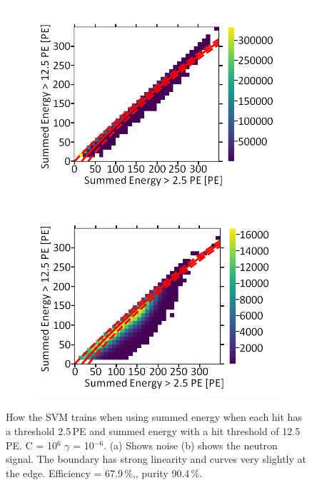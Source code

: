 \begin{figure}[!h]
\centering
\begin{subfigure}{.5\textwidth}
  \centering
  \includegraphics[width=\linewidth]{Appendix1/Figs/Sum1Sum2Noise.png}
  \captionsetup{width=.9\linewidth}
  \caption{}
  \label{subFig:Sum1Sum2N}
\end{subfigure}%
\begin{subfigure}{.5\textwidth}
  \centering
\includegraphics[width=\linewidth]{Appendix1/Figs/Sum1Sum2Signal.png}
  \captionsetup{width=.9\linewidth}
  \caption{}
  \label{subFig:Sum1Sum2S}
\end{subfigure}
\caption[LIBLINEAR SVM Nyström approximated RBF kernel for summed energy > 12.5\,PE vs summed energy > 2.5\,PE.]{How the SVM trains when using summed energy when each hit has a threshold 2.5\,PE and summed energy with a hit threshold of 12.5\,PE. C = 10$^6$ $\gamma$ = 10$^{-6}$. (a) Shows noise (b) shows the neutron signal. The boundary has strong linearity and curves very slightly at the edge. Efficiency = 67.9\,\%,, purity 90.4\,\%.}
\label{fig:Sum1Sum2SN}
\end{figure}

